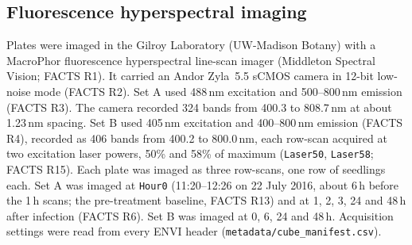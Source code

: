 \subsection{Fluorescence hyperspectral imaging}
Plates were imaged in the Gilroy Laboratory (UW-Madison Botany) with a MacroPhor\texttrademark{}
fluorescence hyperspectral line-scan imager (Middleton Spectral Vision; FACTS R1). It carried an
Andor Zyla~5.5 sCMOS camera in 12-bit low-noise mode (FACTS R2). Set A used 488\,nm excitation
and 500--800\,nm emission (FACTS R3). The camera recorded 324 bands from 400.3 to 808.7\,nm at
about 1.23\,nm spacing. Set B used 405\,nm excitation and 400--800\,nm emission (FACTS R4),
recorded as 406 bands from 400.2 to 800.0\,nm, each row-scan acquired at two excitation laser powers,
50\% and 58\% of maximum (\texttt{Laser50}, \texttt{Laser58}; FACTS R15). Each plate was imaged as three
row-scans, one row of seedlings each.
Set A was imaged at \texttt{Hour0} (11:20--12:26 on 22 July 2016, about 6\,h before the 1\,h scans;
the pre-treatment baseline, FACTS R13) and at 1, 2, 3, 24 and
48\,h after infection (FACTS R6). Set B was imaged at 0, 6, 24 and 48\,h.
Acquisition settings were read from every ENVI header (\texttt{metadata/cube\_manifest.csv}).

